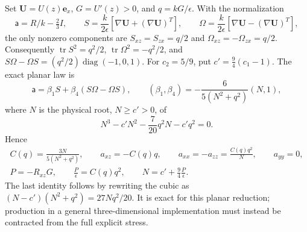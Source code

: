 \documentclass[11pt,a4paper]{article}
\numberwithin{equation}{section}
\begin{document}
Set $\boldsymbol U=U(z)\boldsymbol e_x$, $G=U'(z)>0$, and
$q=kG/\epsilon$. With the normalization
\begin{equation}
 \mathsf a=R/k-\tfrac23I,\qquad
 S=\frac{k}{2\epsilon}
       [\nabla\boldsymbol U+(\nabla\boldsymbol U)^T],\qquad
 \Omega=\frac{k}{2\epsilon}
       [\nabla\boldsymbol U-(\nabla\boldsymbol U)^T],
 \label{ba:outer-normalization}
\end{equation}
the only nonzero components are
$S_{xz}=S_{zx}=q/2$ and $\Omega_{xz}=-\Omega_{zx}=q/2$.
Consequently $\operatorname{tr}S^2=q^2/2$,
$\operatorname{tr}\Omega^2=-q^2/2$, and
$S\Omega-\Omega S=(q^2/2)\operatorname{diag}(-1,0,1)$.
For $c_2=5/9$, put $c'=\tfrac94(c_1-1)$. The exact planar law is
\begin{equation}
 \mathsf a=\beta_1S+\beta_4(S\Omega-\Omega S),\qquad
 (\beta_1,\beta_4)=-\frac6{5(N^2+q^2)}(N,1),
 \label{ba:outer-planar-stress}
\end{equation}
where $N$ is the physical root, $N\geq c'>0$, of
\begin{equation}
 \boxed{N^3-c'N^2-\frac7{20}q^2N-c'q^2=0.}
 \label{ba:outer-cubic}
\end{equation}
Hence
\begin{equation}
 \begin{gathered}
 C(q)=\frac{3N}{5(N^2+q^2)},\qquad
 a_{xz}=-C(q)q,\qquad
 a_{xx}=-a_{zz}=\frac{C(q)q^2}{N},\qquad a_{yy}=0,\\
 P=-R_{xz}G,\qquad \frac P\epsilon=C(q)q^2,\qquad
 N=c'+\frac94\frac P\epsilon.
 \end{gathered}
 \label{ba:outer-shear-identities}
\end{equation}
The last identity follows by rewriting the cubic as
$(N-c')(N^2+q^2)=27Nq^2/20$. It is exact for this planar reduction;
production in a general three-dimensional implementation must instead
be contracted from the full explicit stress.
\end{document}
